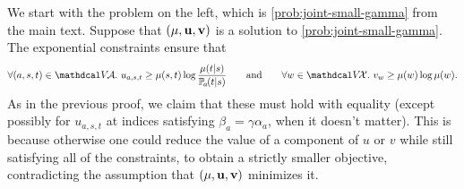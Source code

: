 \begin{subappendices}
\begin{lproof}\label{proof:joint-small-gamma-correct}
    We start with the problem on the left, which is \eqref{prob:joint-small-gamma} from the main text.
    Suppose that $(\mu, \mathbf u, \mathbf v)$ is a solution to \eqref{prob:joint-small-gamma}.
    The exponential constraints ensure that
    \[
        \forall (a,s,t) \in \V\!\Ar.~
        u_{a,s,t} \ge \mu(s,t) \log \frac{\mu(t|s)}{\p_a(t|s)}
    \qquad\text{and}\qquad
        \forall w \in \V\!\X.~
        v_{w} \ge \mu(w) \log \mu(w).
    \]
    As in the previous proof, we claim that these must hold with equality (except possibly for $u_{a,s,t}$ at indices satisfying $\beta_a = \gamma \alpha_a$, when it doesn't matter).
    This is because otherwise one could reduce the value of a component of $u$ or $v$ while still satisfying all of the constraints, to obtain a strictly smaller objective, contradicting the assumption that $(\mu, \mathbf u, \mathbf v)$ minimizes it.


\end{lproof}
\end{subappendices}
